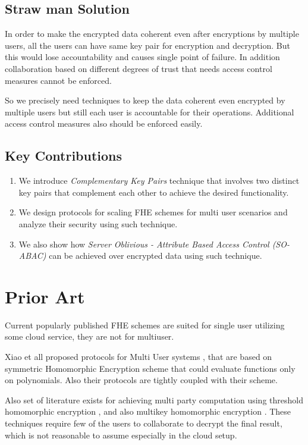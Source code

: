 \documentclass[conference]{IEEEtran}
\numberwithin{equation}{section}
\begin{document}
\subsection{Straw man Solution}
In order to make the encrypted data coherent even after encryptions by multiple users, all the users can have same key pair for encryption and decryption. But this would lose accountability and causes single point of failure. In addition collaboration based on different degrees of trust that needs access control measures cannot be enforced. 

So we precisely need techniques to keep the data coherent even encrypted by multiple users but still each user is accountable for their operations. Additional access control measures also should be enforced easily.

\subsection{Key Contributions} 
\begin{enumerate}
\item We introduce \emph{Complementary Key Pairs} technique that involves two distinct key pairs that complement each other to achieve the desired functionality.
\item  We design protocols for scaling FHE schemes for multi user scenarios and analyze their security using such technique.
\item  We also show how \emph{Server Oblivious - Attribute Based Access Control (SO-ABAC)} can be achieved over encrypted data using such technique.
\end{enumerate}

\section{Prior Art}
 Current popularly published FHE schemes are suited for single user utilizing some cloud service, they are not for multiuser. 

Xiao et all proposed protocols for Multi User systems \cite{xiaoefficient}, that are based on  symmetric Homomorphic Encryption scheme that could evaluate functions only on polynomials. Also their protocols are tightly coupled with their scheme.

Also set of literature exists for achieving multi party computation using threshold homomorphic encryption \cite{cramer2001multiparty},\cite{myers2011threshold} and also multikey homomorphic encryption \cite{lopez2012fly}. These techniques require few of the users to collaborate to decrypt the final result, which is not reasonable to assume especially in the cloud setup.
\end{document}
